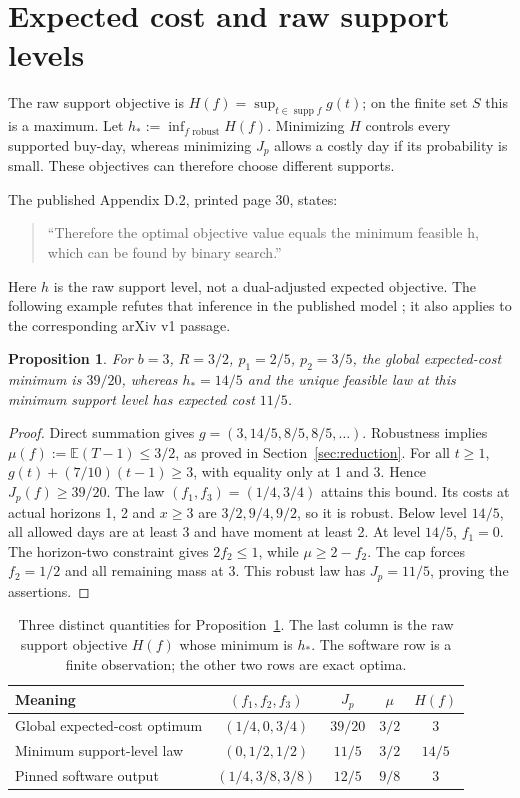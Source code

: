 \documentclass[manuscript,11pt,screen,nonacm]{acmart}
\newtheorem{proposition}[theorem]{Proposition}
\DeclareMathOperator{\supp}{supp}
\newcommand{\E}{\mathbb E}
\begin{document}
\section{Expected cost and raw support levels}\label{sec:separation}
The raw support objective is $H(f)=\sup_{t\in\supp f}g(t)$; on the finite
set $S$ this is a maximum. Let $h_*:=\inf_{f\text{ robust}}H(f)$.
Minimizing $H$ controls every supported buy-day, whereas minimizing $J_p$
allows a costly day if its probability is small. These objectives can
therefore choose different supports.

The published Appendix D.2, printed page 30, states:
\begin{quote}
``Therefore the optimal objective value equals the minimum feasible h,
which can be found by binary search.''
\end{quote}
Here $h$ is the raw support level, not a dual-adjusted expected objective.
The following example refutes that inference in the published model
\cite{pmlr-v306-kim26l}; it also applies to the corresponding arXiv v1 passage.

\begin{proposition}\label{prop:separation}
For $b=3$, $R=3/2$, $p_1=2/5$, $p_2=3/5$, the global expected-cost
minimum is $39/20$, whereas $h_*=14/5$ and the unique feasible law at this
minimum support level has expected cost $11/5$.
\end{proposition}
\begin{proof}
Direct summation gives $g=(3,14/5,8/5,8/5,\ldots)$.
Robustness implies $\mu(f):=\E(T-1)\le3/2$, as proved in Section~\ref{sec:reduction}.
For all $t\ge1$, $g(t)+(7/10)(t-1)\ge3$, with equality only at 1 and 3.
Hence $J_p(f)\ge39/20$. The law $(f_1,f_3)=(1/4,3/4)$ attains this bound.
Its costs at actual horizons 1, 2 and $x\ge3$ are $3/2,9/4,9/2$, so it is robust.
Below level $14/5$, all allowed days are at least 3 and have moment at least 2.
At level $14/5$, $f_1=0$. The horizon-two constraint gives $2f_2\le1$,
while $\mu\ge2-f_2$. The cap forces $f_2=1/2$ and all remaining mass at
3. This robust law has $J_p=11/5$, proving the assertions.
\end{proof}

\begin{table}[ht]
\centering\normalsize
\caption{Three distinct quantities for Proposition~\ref{prop:separation}.
The last column is the raw support objective $H(f)$ whose minimum is $h_*$.
The software row is a finite observation; the other two rows are exact optima.}
\label{tab:separation}
\begin{tabular}{lcccc}
\toprule
Meaning & $(f_1,f_2,f_3)$ & $J_p$ & $\mu$ & $H(f)$\\
\midrule
Global expected-cost optimum & $(1/4,0,3/4)$ & $39/20$ & $3/2$ & $3$\\
Minimum support-level law & $(0,1/2,1/2)$ & $11/5$ & $3/2$ & $14/5$\\
Pinned software output & $(1/4,3/8,3/8)$ & $12/5$ & $9/8$ & $3$\\
\bottomrule
\end{tabular}
\end{table}
\end{document}
